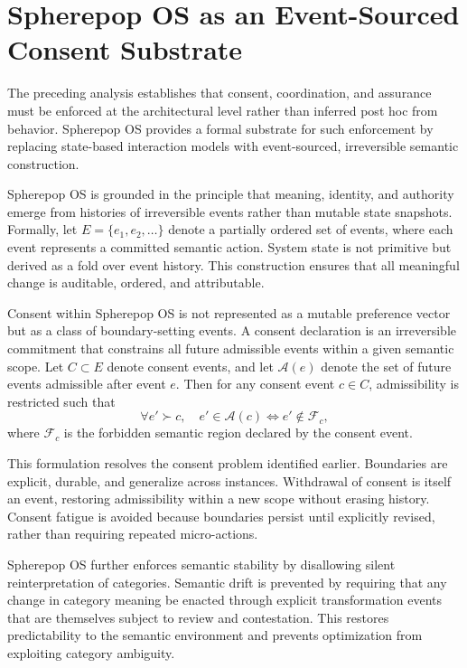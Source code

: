 \documentclass[11pt,oneside]{article}
\begin{document}
\section{Spherepop OS as an Event-Sourced Consent Substrate}

The preceding analysis establishes that consent, coordination, and assurance must be enforced at the architectural level rather than inferred post hoc from behavior. Spherepop OS provides a formal substrate for such enforcement by replacing state-based interaction models with event-sourced, irreversible semantic construction.

Spherepop OS is grounded in the principle that meaning, identity, and authority emerge from histories of irreversible events rather than mutable state snapshots. Formally, let \( E = \{e_1, e_2, \ldots\} \) denote a partially ordered set of events, where each event represents a committed semantic action. System state is not primitive but derived as a fold over event history. This construction ensures that all meaningful change is auditable, ordered, and attributable.

Consent within Spherepop OS is not represented as a mutable preference vector but as a class of boundary-setting events. A consent declaration is an irreversible commitment that constrains all future admissible events within a given semantic scope. Let \( C \subset E \) denote consent events, and let \( \mathcal{A}(e) \) denote the set of future events admissible after event \( e \). Then for any consent event \( c \in C \), admissibility is restricted such that
\[
\forall e' \succ c,\quad e' \in \mathcal{A}(c) \iff e' \notin \mathcal{F}_c,
\]
where \( \mathcal{F}_c \) is the forbidden semantic region declared by the consent event.

This formulation resolves the consent problem identified earlier. Boundaries are explicit, durable, and generalize across instances. Withdrawal of consent is itself an event, restoring admissibility within a new scope without erasing history. Consent fatigue is avoided because boundaries persist until explicitly revised, rather than requiring repeated micro-actions.

Spherepop OS further enforces semantic stability by disallowing silent reinterpretation of categories. Semantic drift is prevented by requiring that any change in category meaning be enacted through explicit transformation events that are themselves subject to review and contestation. This restores predictability to the semantic environment and prevents optimization from exploiting category ambiguity.
\end{document}
